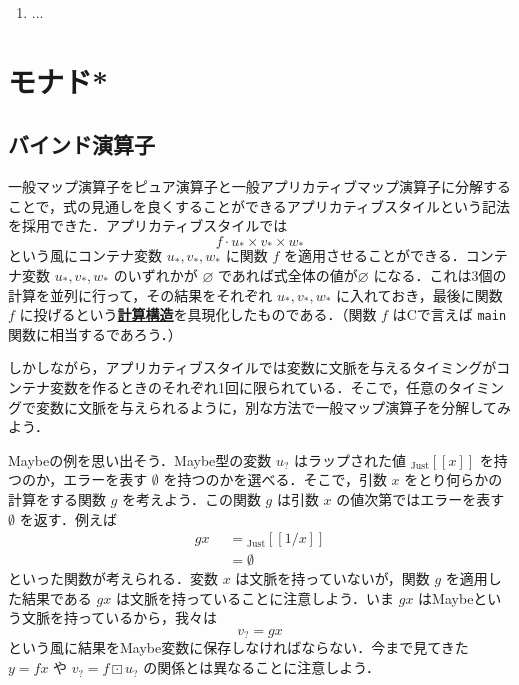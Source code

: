 \documentclass[a5paper,twoside,fleqn,draft]{jsbook}
\def\[{[\![}
\def\]{]\!]}
\newcommand{\programminglanguage}[1]{\textsf{#1}}
\newcommand{\clang}{\programminglanguage{C}}
\newcommand{\keyword}[1]{{\underline{\textbf{#1}}}}
\newcommand{\code}[1]{\texttt{#1}}
\newcommand{\mKeyword}[1]{\mathsf{#1}}
\newcommand{\mOtherwiseKeyword}{\mKeyword{otherwise}}
\DeclareMathOperator{\mOtherwise}{\mOtherwiseKeyword}
\newcommand{\mNothing}{\emptyset}
\newcommand{\mPureNothing}{\varnothing}
\DeclareMathOperator{\mAppMap}{\times}
\DeclareMathOperator{\mMap}{\cdot}
\DeclareMathOperator{\mMapMaybe}{\boxdot}
\newcommand{\mValueConstructor}[1]{\mathrm{#1}}
\newcommand{\mValueWith}[2]{{}_\mValueConstructor{#1}\[#2\]}
\newcommand{\mJustWith}[1]{\mValueWith{Just}{#1}}
\newcommand{\mMaybe}[1]{{#1}_?}
\newcommand{\mContainer}[1]{{#1}_*}
\newcommand{\mGuard}[1]{\mathop{\mid_{#1}}}
\begin{document}
\begin{enumerate}
\item ...
\end{enumerate}

\chapter{モナド*}
\label{ch:monad}

\section{バインド演算子}

一般マップ演算子をピュア演算子と一般アプリカティブマップ演算子に分解することで，式の見通しを良くすることができるアプリカティブスタイルという記法を採用できた．アプリカティブスタイルでは
\begin{equation}
  f\mMap\mContainer{u}\mAppMap\mContainer{v}\mAppMap\mContainer{w}
\end{equation}
という風にコンテナ変数 $\mContainer{u},\mContainer{v},\mContainer{w}$ に関数 $f$ を適用させることができる．コンテナ変数 $\mContainer{u},\mContainer{v},\mContainer{w}$ のいずれかが $\mPureNothing$ であれば式全体の値が$\mPureNothing$ になる．これは3個の計算を並列に行って，その結果をそれぞれ $\mContainer{u},\mContainer{v},\mContainer{w}$ に入れておき，最後に関数 $f$ に投げるという\keyword{計算構造}を具現化したものである．（関数 $f$ は\clang で言えば \code{main} 関数に相当するであろう．）

しかしながら，アプリカティブスタイルでは変数に文脈を与えるタイミングがコンテナ変数を作るときのそれぞれ1回に限られている．そこで，任意のタイミングで変数に文脈を与えられるように，別な方法で一般マップ演算子を分解してみよう．

Maybeの例を思い出そう．Maybe型の変数 $\mMaybe{u}$ はラップされた値 $\mJustWith{x}$ を持つのか，エラーを表す $\mNothing$ を持つのかを選べる．そこで，引数 $x$ をとり何らかの計算をする関数 $g$ を考えよう．この関数 $g$ は引数 $x$ の値次第ではエラーを表す $\mNothing$ を返す．例えば
\begin{equation}
  \begin{aligned}
    gx&\mGuard{x\neq0}=\mJustWith{1/x}\\
    &\mGuard{\mOtherwise}=\mNothing
  \end{aligned}
\end{equation}
といった関数が考えられる．変数 $x$ は文脈を持っていないが，関数 $g$ を適用した結果である $gx$ は文脈を持っていることに注意しよう．いま $gx$ はMaybeという文脈を持っているから，我々は
\begin{equation}
\mMaybe{v}=gx
\end{equation}
という風に結果をMaybe変数に保存しなければならない．今まで見てきた $y=fx$ や $\mMaybe{v}=f\mMapMaybe\mMaybe{u}$ の関係とは異なることに注意しよう．
\end{document}
